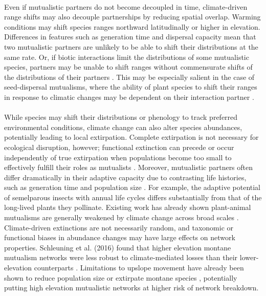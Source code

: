     \paragraph*{} 
    Even if mutualistic partners do not become decoupled in time, climate-driven range shifts may also decouple partnerships by reducing spatial overlap. Warming conditions may shift species ranges northward latitudinally or higher in elevation. Differences in features such as generation time and dispersal capacity mean that two mutualistic partners are unlikely to be able to shift their distributions at the same rate. Or, if biotic interactions limit the distributions of some mutualistic species, partners may be unable to shift ranges without commensurate shifts of the distributions of their partners \parencite{warren2014mutualism}. This may be especially salient in the case of seed-dispersal mutualisms, where the ability of plant species to shift their ranges in response to climatic changes may be dependent on their interaction partner \parencite{warren2014mutualism}.

    \paragraph*{}
    While species may shift their distributions or phenology to track preferred environmental conditions, climate change can also alter species abundances, potentially leading to local extirpation. Complete extirpation is not necessary for ecological disruption, however; functional extinction can precede or occur independently of true extirpation when populations become too small to effectively fulfill their roles as mutualists \parencite{costa2018defaunation}. Moreover, mutualistic partners often differ dramatically in their adaptive capacity due to contrasting life histories, such as generation time and population size \parencite{toby2010mutualisms}. For example, the adaptive potential of semelparous insects with annual life cycles differs substantially from that of the long-lived plants they pollinate. Existing work has already shown plant-animal mutualisms are generally weakened by climate change across broad scales \parencite{tylianakis2008global}. Climate-driven extinctions are not necessarily random, and taxonomic or functional biases in abundance changes may have large effects on network properties. Schleuning et al. (2016) found that higher elevation montane mutualism networks were less robust to climate-mediated losses than their lower-elevation counterparts \parencite{schleuning2016ecological}. Limitations to upslope movement have already been shown to reduce population size or extirpate montane species \parencite{freeman2018climate}, potentially putting high elevation mutualistic networks at higher risk of network breakdown. 
    
